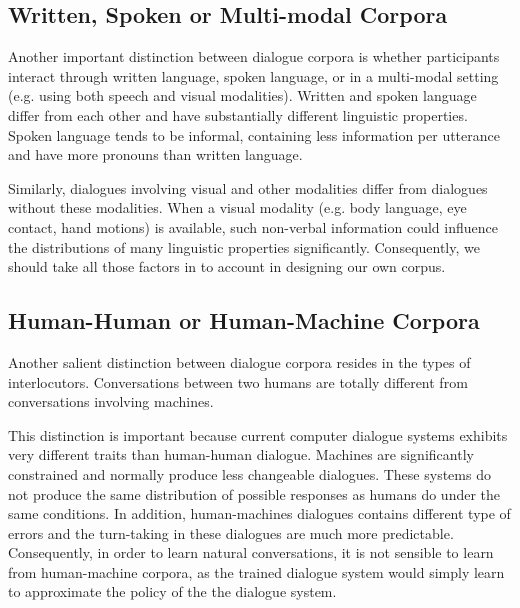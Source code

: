 \documentclass[bsc,frontabs,twoside,singlespacing,parskip,deptreport]{infthesis}     %
\begin{document}
\subsection{Written, Spoken or Multi-modal Corpora}

Another important distinction between dialogue corpora is whether participants interact through written language, spoken language, or in a multi-modal setting (e.g. using both speech and visual modalities). Written and spoken language differ from each other and have substantially different linguistic properties. Spoken language tends to be informal, containing less information per utterance and have more pronouns than written language\cite{carter2006cambridge,biber2001diachronic}.

Similarly, dialogues involving visual and other modalities differ from dialogues without these modalities\cite{serban2015survey,duncan1983charles}. When a visual modality (e.g. body language, eye contact, hand motions) is available, such non-verbal information could influence the distributions of many linguistic properties significantly\cite{gibson1963perception,lord1974perception,cooper1974control,chartrand1999chameleon,de2013speaker}. Consequently, we should take all those factors in to account in designing our own corpus.

\subsection{Human-Human or Human-Machine Corpora}

Another salient distinction between dialogue corpora resides in the types of interlocutors. Conversations between two humans are totally different from conversations involving machines.

This distinction is important because current computer dialogue systems exhibits very different traits than human-human dialogue\cite{doran2003comparing}. Machines are significantly constrained and normally produce less changeable dialogues. These systems do not produce the same distribution of possible responses as humans do under the same conditions. In addition, human-machines dialogues contains different type of errors and the turn-taking in these dialogues are much more predictable\cite{williams2007partially}. Consequently, in order to learn natural conversations, it is not sensible to learn from human-machine corpora, as the trained dialogue system would simply learn to approximate the policy of the the dialogue system\cite{serban2018survey}.
\end{document}
